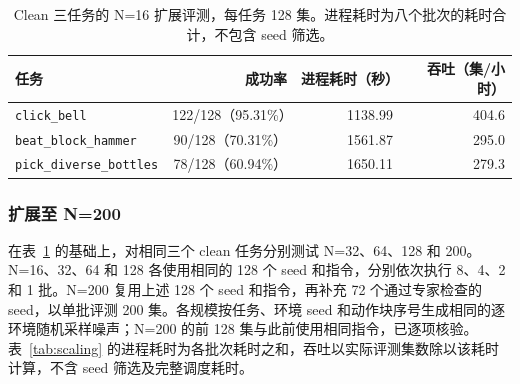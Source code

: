 \documentclass{article}
\begin{document}
\begin{table}[htbp]
\centering\small
\caption{Clean 三任务的 N=16 扩展评测，每任务 128 集。进程耗时为八个批次的耗时合计，不包含 seed 筛选。}
\label{tab:three128}
\begin{tabular}{@{}lrrr@{}}
\toprule
任务 & 成功率 & 进程耗时（秒） & 吞吐（集/小时） \\
\midrule
\texttt{click\_bell} & 122/128（95.31\%） & 1138.99 & 404.6 \\
\texttt{beat\_block\_hammer} & 90/128（70.31\%） & 1561.87 & 295.0 \\
\texttt{pick\_diverse\_bottles} & 78/128（60.94\%） & 1650.11 & 279.3 \\
\bottomrule
\end{tabular}
\end{table}

\subsubsection{扩展至 N=200}
在表~\ref{tab:three128} 的基础上，对相同三个 clean 任务分别测试 N=32、64、128 和 200。N=16、32、64 和 128 各使用相同的 128 个 seed 和指令，分别依次执行 8、4、2 和 1 批。N=200 复用上述 128 个 seed 和指令，再补充 72 个通过专家检查的 seed，以单批评测 200 集。各规模按任务、环境 seed 和动作块序号生成相同的逐环境随机采样噪声；N=200 的前 128 集与此前使用相同指令，已逐项核验。表~\ref{tab:scaling} 的进程耗时为各批次耗时之和，吞吐以实际评测集数除以该耗时计算，不含 seed 筛选及完整调度耗时。
\end{document}
